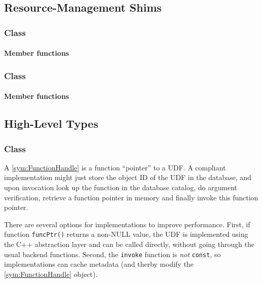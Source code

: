 \subsection{Resource-Management Shims}

\subsubsection[Class Allocator]{Class }

\paragraph{Member functions}

\subsubsection[Class NativeRandomNumberGenerator]{Class }

\paragraph{Member functions}


\subsection{High-Level Types}

\subsubsection[Class FunctionHandle]{Class }

A \ref{sym:FunctionHandle} is a function ``pointer'' to a UDF. A compliant implementation might just store the object ID of the UDF in the database, and upon invocation look up the function in the database catalog, do argument verification, retrieve a function pointer in memory and finally invoke this function pointer.

There are several options for implementations to improve performance. First, if function \texttt{funcPtr()} returns a non-NULL value, the UDF is implemented using the C++ abstraction layer and can be called directly, without going through the usual backend functions. Second, the \texttt{invoke} function is \emph{not} \texttt{const}, so implementations can cache metadata (and therby modify the \ref{sym:FunctionHandle} object).

